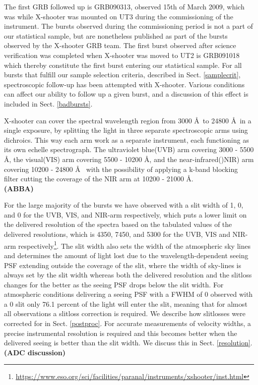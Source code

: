 \documentclass{aa}    %
\newcommand\todo[1]{\textbf{(#1)}}
\begin{document}
The first GRB followed up is GRB090313, observed 15th of March 2009, which was
while X-shooter was mounted on UT3 during the commissioning of the instrument.
The bursts observed during the commissioning period is not a part of our
statistical sample, but are nonetheless published as part of the bursts observed
by the X-shooter GRB team. The first burst observed after science verification
was completed when X-shooter was moved to UT2 is GRB091018 which thereby
constitute the first burst entering our statistical sample. For all bursts that
fulfill our sample selection criteria, described in Sect. \ref{samplecrit},
spectroscopic follow-up has been attempted with X-shooter. Various conditions
can affect our ability to follow up a given burst, and a discussion of this
effect is included in Sect. \ref{badbursts}.

X-shooter can cover the spectral wavelength region from 3000 \AA~to 24800 \AA~in
a single exposure, by splitting the light in three separate spectroscopic arms
using dichroics. This way each arm work as a separate instrument, each
functioning as its own echelle spectrograph. The ultraviolet blue(UVB) arm
covering 3000 - 5500 \AA, the visual(VIS) arm covering 5500 - 10200 \AA, and the
near-infrared()NIR) arm covering 10200 - 24800 \AA~ with the possibility of
applying a k-band blocking filter cutting the coverage of the NIR arm at 10200 -
21000 \AA.
\\

\todo{ABBA}


For the large majority of the bursts we have observed with a slit width of
1, 0, and 0 for the UVB, VIS, and NIR-arm respectively, which
puts a lower limit on the delivered resolution of the spectra based on the
tabulated values of the delivered resolutions, which is 4350, 7450, and 5300 for
the UVB, VIS and NIR-arm respectively\footnote{\url{https://www.eso.org/sci/facilities/paranal/instruments/xshooter/inst.html}}.
The slit width also sets the width of the atmospheric sky lines and determines
the amount of light lost due to the wavelength-dependent seeing PSF extending
outside the coverage of the slit, where the width of sky-lines is always set by
the slit width whereas both the delivered resolution and the slitloss changes
for the better as the seeing PSF drops below the slit width.
For atmospheric conditions delivering a seeing PSF with a FWHM of 0
observed with a 0 slit only 76.1 percent of the light will enter the slit,
meaning that for almost all observations a slitloss correction is required. We
describe how slitlosses were corrected for in Sect. \ref{postproc}.
For accurate measurements of velocity widths, a precise instrumental resolution
is required and this becomes better when the delivered seeing is better than the
slit width. We discuss this in Sect. \ref{resolution}.
\\
\todo{ADC discussion}
\end{document}
